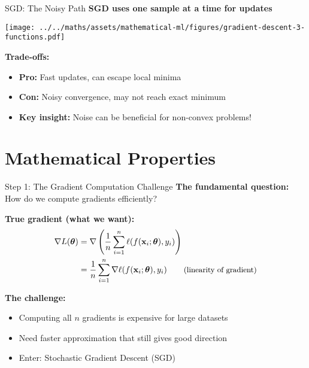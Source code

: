 \documentclass[usenames,dvipsnames]{beamer}
\begin{document}
  \begin{frame}{SGD: The Noisy Path}
    \textbf{SGD uses one sample at a time for updates}
    
    \begin{center}
    \texttt{[image: ../../maths/assets/mathematical-ml/figures/gradient-descent-3-functions.pdf]}
    \end{center}
    
    \pause
    \textbf{Trade-offs:}
    \begin{itemize}[<+->]
        \item \textbf{Pro:} Fast updates, can escape local minima
        \item \textbf{Con:} Noisy convergence, may not reach exact minimum
        \item \textbf{Key insight:} Noise can be beneficial for non-convex problems!
    \end{itemize}
  \end{frame}

  \section{Mathematical Properties}

  \begin{frame}{Step 1: The Gradient Computation Challenge}
    \textbf{The fundamental question:} How do we compute gradients efficiently?
    
    \pause
    \textbf{True gradient (what we want):}
    \begin{align}
    \nabla L(\boldsymbol{\theta}) &= \nabla \left(\frac{1}{n}\sum_{i=1}^n \ell(f(\mathbf{x}_i;\boldsymbol{\theta}),y_i)\right)\\
    &= \frac{1}{n}\sum_{i=1}^n \nabla \ell(f(\mathbf{x}_i;\boldsymbol{\theta}),y_i) \qquad \text{\small (linearity of gradient)}
    \end{align}

    \pause
    \textbf{The challenge:}
    \begin{itemize}[<+->]
        \item Computing all $n$ gradients is expensive for large datasets
        \item Need faster approximation that still gives good direction
        \item Enter: Stochastic Gradient Descent (SGD)
    \end{itemize}
  \end{frame}
\end{document}
